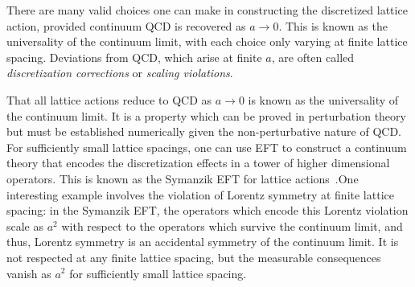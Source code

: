 \documentclass{ar-1col}
\begin{document}
There are many valid choices one can make in constructing the discretized lattice action, provided continuum QCD is recovered as $a\rightarrow0$.
This is known as the universality of the continuum limit, with each choice only varying at finite lattice spacing.
Deviations from QCD, which arise at finite $a$, are often called \textit{discretization corrections} or \textit{scaling violations}.%
\begin{marginnote}
\end{marginnote}%
That all lattice actions reduce to QCD as $a\rightarrow0$ is known as the universality of the continuum limit.  It is a property which can be proved in perturbation theory but must be established numerically given the non-perturbative nature of QCD.  For sufficiently small lattice spacings, one can use EFT to construct a continuum theory that encodes the discretization effects in a tower of higher dimensional operators. This is known as the Symanzik EFT for lattice actions~\cite{Symanzik:1983dc,Symanzik:1983gh}.One interesting example involves the violation of Lorentz symmetry at finite lattice spacing: in the Symanzik EFT, the operators which encode this Lorentz violation scale as $a^2$ with respect to the operators which survive the continuum limit, and thus, Lorentz symmetry is an accidental symmetry of the continuum limit.  It is not respected at any finite lattice spacing, but the measurable consequences vanish as $a^2$ for sufficiently small lattice spacing.
\end{document}
